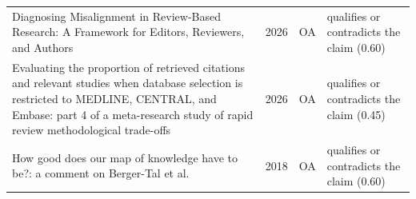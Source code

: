 \begin{longtable}{@{}%
  >{\raggedright\arraybackslash}p{}c%
  >{\raggedright\arraybackslash}p{}%
  >{\raggedright\arraybackslash}p{}@{}}
Diagnosing Misalignment in Review-Based Research: A Framework for Editors, Reviewers, and Authors & 2026 & OA & qualifies or contradicts the claim (0.60) \\
Evaluating the proportion of retrieved citations and relevant studies when database selection is restricted to MEDLINE, CENTRAL, and Embase: part 4 of a meta-research study of rapid review methodological trade-offs & 2026 & OA & qualifies or contradicts the claim (0.45) \\
How good does our map of knowledge have to be?: a comment on Berger-Tal et al. & 2018 & OA & qualifies or contradicts the claim (0.60) \\
\end{longtable}
\endgroup
